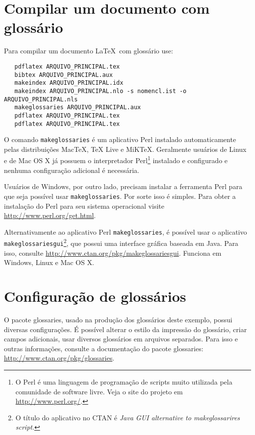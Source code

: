\section{Compilar um documento com glossário}
\label{sec-compilar-glossario}

Para compilar um documento \LaTeX\ com glossário use:

\begin{verbatim}
   pdflatex ARQUIVO_PRINCIPAL.tex
   bibtex ARQUIVO_PRINCIPAL.aux
   makeindex ARQUIVO_PRINCIPAL.idx
   makeindex ARQUIVO_PRINCIPAL.nlo -s nomencl.ist -o ARQUIVO_PRINCIPAL.nls
   makeglossaries ARQUIVO_PRINCIPAL.aux
   pdflatex ARQUIVO_PRINCIPAL.tex
   pdflatex ARQUIVO_PRINCIPAL.tex
\end{verbatim}

O comando \texttt{makeglossaries} é um aplicativo Perl instalado
automaticamente pelas distribuições MacTeX, TeX Live e MiKTeX. Geralmente
usuários de Linux e de Mac OS X já possuem o interpretador Perl\footnote{O Perl
é uma linguagem de programação de scripts muito utilizada pela comunidade de
software livre. Veja o site do projeto em \url{http://www.perl.org/}.} instalado
e configurado e nenhuma configuração adicional é necessária.

Usuários de Windows, por outro lado, precisam instalar a ferramenta Perl para
que seja possível usar \texttt{makeglossaries}. Por sorte isso é simples. Para
obter a instalação do Perl para seu sistema operacional visite \url{http://www.perl.org/get.html}.

Alternativamente ao aplicativo Perl \texttt{makeglossaries}, é possível usar o
aplicativo \texttt{makeglossariesgui}\footnote{O título do aplicativo no CTAN
é \textit{Java GUI alternative to makeglossarires script}.}, que possui uma
interface gráfica baseada em Java. Para isso, consulte
\url{http://www.ctan.org/pkg/makeglossariesgui}. Funciona em Windows,
Linux e Mac OS X.

\section{Configuração de glossários}

O pacote \textsf{glossaries}, usado na produção dos glossários deste exemplo,
possui diversas configurações. É possível alterar o estilo da impressão do
glossário, criar campos adicionais, usar diversos glossários em
arquivos separados. Para isso e outras informações, consulte a documentação do
pacote \textsf{glossaries}: \url{http://www.ctan.org/pkg/glossaries}.


